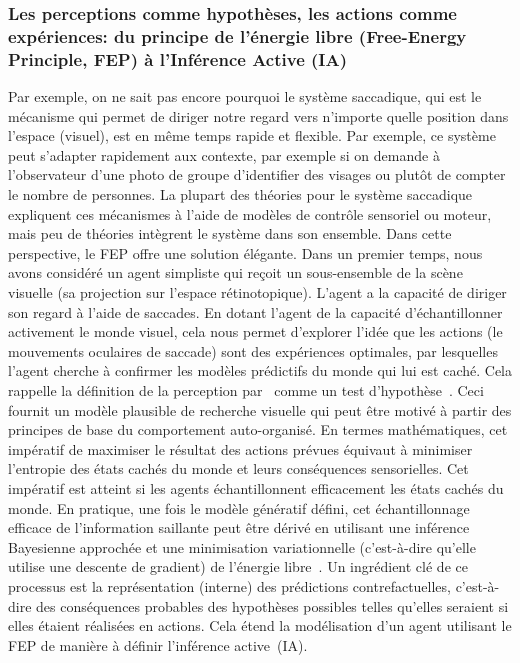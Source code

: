 \subsubsection{Les perceptions comme hypothèses, les actions comme expériences: du principe de
l'énergie libre (Free-Energy Principle, FEP) à l'Inférence Active (IA)}
Par exemple, on ne sait pas encore pourquoi le système saccadique, qui est le mécanisme qui
permet de diriger notre regard vers n'importe quelle position dans l'espace
(visuel), est en même temps rapide et flexible. Par
exemple, ce système peut s'adapter rapidement aux contexte,
par exemple si on demande à l'observateur d'une photo de groupe d'identifier des visages ou plutôt de compter le nombre de personnes. La plupart des théories pour le système saccadique expliquent ces mécanismes à l'aide de
modèles de contrôle sensoriel ou moteur, mais peu de théories intègrent
le système dans son ensemble. Dans cette perspective, le FEP offre une
solution élégante. Dans un premier temps, nous avons considéré un agent
simpliste qui reçoit un sous-ensemble de la scène visuelle (sa
projection sur l'espace rétinotopique). L'agent a la capacité de diriger
son regard à l'aide de saccades. En dotant l'agent de la capacité
d'échantillonner activement le monde visuel, cela nous permet d'explorer
l'idée que les actions (le mouvements oculaires de saccade) sont des
expériences optimales, par lesquelles l'agent cherche à confirmer les
modèles prédictifs du monde qui lui est caché. Cela rappelle la définition de la
perception par~\citet{vonHelmholtz1867} comme un test d'hypothèse~\citep{Gregory80}. Ceci fournit un modèle plausible de recherche visuelle
qui peut être motivé à partir des principes de base du comportement
auto-organisé. En termes mathématiques, cet impératif de maximiser le
résultat des actions prévues équivaut à minimiser l'entropie des états
cachés du monde et leurs conséquences sensorielles. Cet impératif est
atteint si les agents échantillonnent efficacement les états cachés du
monde. En pratique, une fois le modèle génératif défini, cet
échantillonnage efficace de l'information saillante peut être dérivé en
utilisant une inférence Bayesienne approchée et une minimisation
variationnelle (c'est-à-dire qu'elle utilise une descente de gradient) de l'énergie libre~\citep{Friston10}. Un ingrédient clé
de ce processus est la représentation (interne) des prédictions
contrefactuelles, c'est-à-dire des conséquences probables des hypothèses
possibles telles qu'elles seraient si elles étaient réalisées en actions.
Cela étend
la modélisation d'un agent utilisant le FEP de manière à définir l'inférence
active~(IA).


